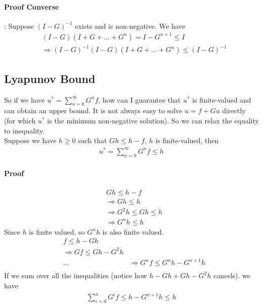 \paragraph{Proof Converse}: Suppose $(I-G)^{-1}$  exists and is non-negative. We have 
    \begin{align*}
        & (I-G)(I+ G + ... + G^n) = I - G^{n+1} \leq I \\
        & \Longrightarrow (I-G)^{-1}(I-G)(I+G+...+G^n)\leq (I-G)^{-1}
    \end{align*}
    
\subsection{Lyapunov Bound}
So if we have $u^* = \sum_{n=0}^\infty G^n f$, how can I guarantee that $u^*$ is finite-valued and can obtain an upper bound. It is not always easy to solve $u = f + G u$ directly (for which $u^*$ is the minimum non-negative solution). So we can relax the equality to inequality. \\

Suppose we have $h \geq 0$ such that $Gh \leq h-f$, $h$ is finite-valued, then 
    \begin{align*}
        u^* = \sum_{n=0}^\infty G^n f \leq h
    \end{align*}
    
\paragraph{Proof} 
\begin{align*}
    & Gh \leq h - f\\
    & \Longrightarrow Gh \leq h \tag{$f$ is non-negative} \\
    & \Longrightarrow G^2h \leq Gh \leq h \\
    & \Longrightarrow G^nh \leq h
\end{align*}
Since $h$ is finite valued, so $G^nh$ is also finite valued. 
\begin{align*}
    & f \leq h - Gh \tag{Assumption} \\
    & \Longrightarrow Gf \leq Gh - G^2h \\
    & ...
    & \Longrightarrow G^n f \leq G^nh - G^{n+1}h\\
\end{align*}
If we sum over all the inequalities (notice how $h - Gh + Gh - G^2h$ cancels). we have 
    \begin{align*}
        \sum_{i=0}^n G^if \leq h - G^{n+1} h \leq h
    \end{align*}
    
